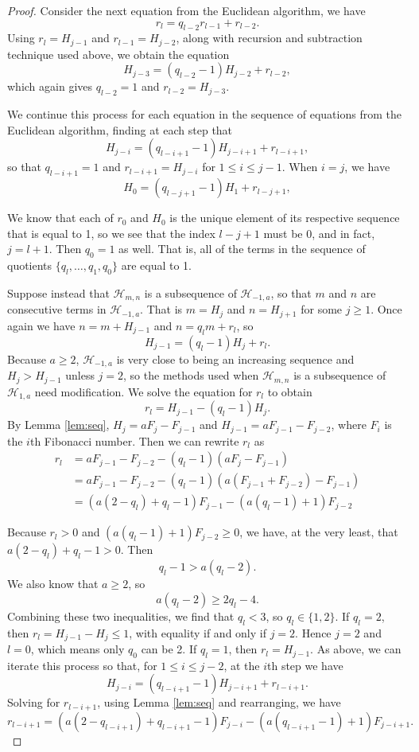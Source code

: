 \documentclass{amsart}
\begin{document}
\begin{proof}
Consider the next equation from the Euclidean algorithm, we have $$r_l = q_{l-2} r_{l-1} + r_{l-2}.$$ Using $r_l = H_{j-1}$ and $r_{l-1} = H_{j-2}$, along with recursion and subtraction technique used above, we obtain the equation $$H_{j-3} = (q_{l-2}-1) H_{j-2} + r_{l-2},$$ which again gives $q_{l-2} = 1$ and $r_{l-2} = H_{j-3}$. 

We continue this process for each equation in the sequence of equations from the Euclidean algorithm, finding at each step that $$H_{j-i} = (q_{l-i+1}-1) H_{j-i+1} + r_{l-i+1}, $$ so that $q_{l-i+1}=1$ and $r_{l-i+1} = H_{j-i}$ for $1\le i \le j-1$. When $i = j$, we have $$H_{0} = (q_{l-j+1}-1) H_{1} + r_{l-j+1}, $$ 

We know that each of $r_0$ and $H_0$ is the unique element of its respective sequence that is equal to 1, so we see that the index $l-j+1$ must be 0, and in fact, $j = l+1$. Then $q_0 =1 $ as well. That is, all of the terms in the sequence of quotients $\{q_l,  \ldots, q_1, q_0\}$ are equal to 1. 

Suppose instead that $\mathcal H_{m,n}$ is a subsequence of $\mathcal H_{- 1, a}$, so that $m$ and $n$ are consecutive terms in $\mathcal H_{-1, a}$. That is $m = H_j $ and $n = H_{j+1} $ for some $j\ge 1$.  Once again we have $n = m + H_{j-1}$ and $n = q_l m + r_l$, so $$H_{j-1} = (q_l - 1) H_j + r_l .$$ Because $a \ge 2$, $\mathcal H_{-1, a}$ is very close to being an increasing sequence and $H_{j} > H_{j-1}$ unless $j = 2$, so the methods used when $\mathcal H_{m,n}$ is a subsequence of $\mathcal H_{1,a}$ need modification. We solve the equation for $r_l$ to obtain 
$$r_l = H_{j-1} - (q_l - 1)H_j .$$ By Lemma \ref{lem:seq}, $H_j = aF_j - F_{j-1}$ and $H_{j-1} = aF_{j-1} - F_{j-2}$, where $F_i$ is the $i$th Fibonacci number. Then we can rewrite $r_l$ as 
\begin{align*}
r_l &= aF_{j-1} - F_{j-2} - (q_l - 1)(aF_j - F_{j-1}) \\
&=  aF_{j-1} - F_{j-2} - (q_l - 1)(a(F_{j-1}+F_{j-2}) - F_{j-1}) \\
& = (a(2-q_l) +q_l - 1) F_{j-1} - (a(q_l-1) +1)F_{j-2} 
\end{align*}

Because $r_l > 0$ and $(a(q_l-1) +1)F_{j-2} \ge 0$, we have, at the very least, that $a(2-q_l) +q_l - 1 >0$. Then $$q_l - 1>a(q_l -2).$$
We also know that $a \ge 2$, so $$a(q_l - 2) \ge 2q_l -4.$$ Combining these two inequalities, we find that $ q_l < 3$, so $q_l \in \{1, 2\}$.  If $q_l = 2$, then $r_l = H_{j-1} - H_j \le 1$, with equality if and only if $j = 2$. Hence $j = 2$ and $l = 0$, which means only $q_0$ can be 2. If $q_l = 1$, then $r_l = H_{j-1}$. As above, we can iterate this process so that, for $1\le i \le j-2$, at the $i$th step we have $$H_{j-i} = (q_{l-i+1}-1) H_{j-i+1} + r_{l-i+1}. $$ Solving for $r_{l-i+1}$, using Lemma \ref{lem:seq} and rearranging, we have $$r_{l-i+1} = (a(2-q_{l-i+1}) +q_{l-i+1} - 1) F_{j-i} - (a(q_{l-i+1}-1) +1)F_{j-i+1}  .$$


\end{proof}
\end{document}
